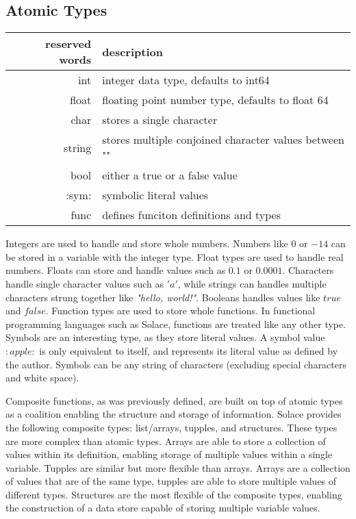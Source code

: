 \documentclass{article}
\begin{document}
\subsection{Atomic Types}
\begin{center}
\begin{tabular}{|r|l|}
	\hline
	reserved words & description \\
	\hline
	\hline
	int & integer data type, defaults to int64 \\
	float & floating point number type, defaults to float 64 \\
	char & stores a single character \\
	string & stores multiple conjoined character values between "" \\
	bool & either a true or a false value \\
	:sym: & symbolic literal values \\
	func & defines funciton definitions and types \\
	\hline
\end{tabular}
\end{center}

Integers are used to handle and store whole numbers. Numbers like $0$ or $-14$ can be stored in a variable with the integer type. Float
types are used to handle real numbers. Floats can store and handle values such as $0.1$ or $0.0001$. Characters handle single character
values such as $'a'$, while strings can handles multiple characters strung together like \textit{"hello, world!"}. Booleans handles values like
$true$ and $false$. Function types are used to store whole functions. In functional programming languages such as Solace, functions are
treated like any other type. Symbols are an interesting type, as they store literal values. A symbol value $:apple:$ is only equivalent
to itself, and represents its literal value as defined by the author. Symbols can be any string of characters (excluding special
characters and white space).

Composite functions, as was previously defined, are built on top of atomic types as a coalition enabling the structure and storage of
information. Solace provides the following composite types: list/arrays, tupples, and structures. These types are more complex than
atomic types. Arrays are able to store a collection of values within its definition, enabling storage of multiple values within a single
variable. Tupples are similar but more flexible than arrays. Arrays are a collection of values that are of the same type, tupples are able
to store multiple values of different types. Structures are the most flexible of the composite types, enabling the construction of a data
store capable of storing multiple variable values.
\end{document}

